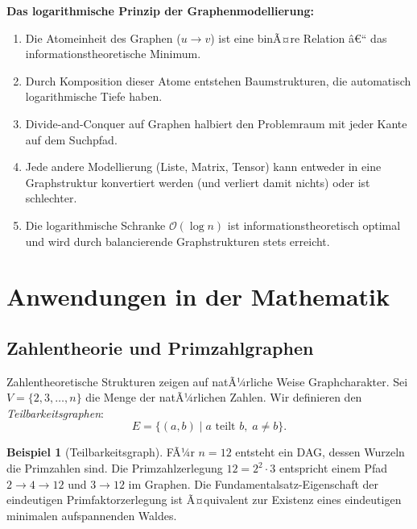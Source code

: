﻿\documentclass[12pt,a4paper,twoside]{article}
\theoremstyle{definition}
\newtheorem{beispiel}{Beispiel}[section]
\theoremstyle{plain}
\theoremstyle{remark}
\begin{document}
\textbf{Das logarithmische Prinzip der Graphenmodellierung:}
\begin{enumerate}
  \item Die Atomeinheit des Graphen ($u \to v$) ist eine binÃ¤re
        Relation â€“ das informationstheoretische Minimum.
  \item Durch Komposition dieser Atome entstehen Baumstrukturen,
        die automatisch logarithmische Tiefe haben.
  \item Divide-and-Conquer auf Graphen halbiert den Problemraum
        mit jeder Kante auf dem Suchpfad.
  \item Jede andere Modellierung (Liste, Matrix, Tensor) kann
        entweder in eine Graphstruktur konvertiert werden
        (und verliert damit nichts) oder ist schlechter.
  \item Die logarithmische Schranke $\mathcal{O}(\log n)$
        ist informationstheoretisch optimal und wird durch
        balancierende Graphstrukturen stets erreicht.
\end{enumerate}

\section{Anwendungen in der Mathematik}
\label{sec:math}

\subsection{Zahlentheorie und Primzahlgraphen}

Zahlentheoretische Strukturen zeigen auf natÃ¼rliche Weise
Graphcharakter. Sei $V = \{2, 3, \ldots, n\}$ die Menge der
natÃ¼rlichen Zahlen.  Wir definieren den \emph{Teilbarkeitsgraphen}:
\[
  E = \{(a,b) \mid a \text{ teilt } b,\; a \neq b\}.
\]

\begin{beispiel}[Teilbarkeitsgraph]
FÃ¼r $n=12$ entsteht ein DAG, dessen Wurzeln die Primzahlen sind.
Die Primzahlzerlegung $12 = 2^2 \cdot 3$ entspricht einem Pfad
$2 \to 4 \to 12$ und $3 \to 12$ im Graphen.  Die
Fundamentalsatz-Eigenschaft der eindeutigen Primfaktorzerlegung
ist Ã¤quivalent zur Existenz eines eindeutigen minimalen
aufspannenden Waldes.
\end{beispiel}
\end{document}
